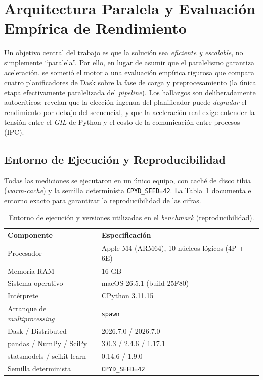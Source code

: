 \documentclass[12pt,letterpaper]{article}
\begin{document}
\section{Arquitectura Paralela y Evaluación Empírica de Rendimiento}
\label{sec:benchmark}
Un objetivo central del trabajo es que la solución sea \textit{eficiente y escalable}, no
simplemente ``paralela''. Por ello, en lugar de asumir que el paralelismo garantiza aceleración,
se sometió el motor a una evaluación empírica rigurosa que compara cuatro planificadores de Dask
sobre la fase de carga y preprocesamiento (la única etapa efectivamente paralelizada del
\textit{pipeline}). Los hallazgos son deliberadamente autocríticos: revelan que la elección ingenua
del planificador puede \textit{degradar} el rendimiento por debajo del secuencial, y que la
aceleración real exige entender la tensión entre el \textit{GIL} de Python y el costo de la
comunicación entre procesos (IPC).

\subsection{Entorno de Ejecución y Reproducibilidad}
Todas las mediciones se ejecutaron en un único equipo, con caché de disco tibia (\textit{warm-cache})
y la semilla determinista \texttt{CPYD\_SEED=42}. La Tabla~\ref{tab:entorno} documenta el entorno
exacto para garantizar la reproducibilidad de las cifras.

\begin{table}[H]
\centering
\small
\begin{tabular}{ll}
\toprule
\textbf{Componente} & \textbf{Especificación} \\
\midrule
Procesador & Apple M4 (ARM64), 10 núcleos lógicos (4P + 6E) \\
Memoria RAM & 16 GB \\
Sistema operativo & macOS 26.5.1 (build 25F80) \\
Intérprete & CPython 3.11.15 \\
Arranque de \textit{multiprocessing} & \texttt{spawn} \\
Dask / Distributed & 2026.7.0 / 2026.7.0 \\
pandas / NumPy / SciPy & 3.0.3 / 2.4.6 / 1.17.1 \\
statsmodels / scikit-learn & 0.14.6 / 1.9.0 \\
Semilla determinista & \texttt{CPYD\_SEED=42} \\
\bottomrule
\end{tabular}
\caption{Entorno de ejecución y versiones utilizadas en el \textit{benchmark} (reproducibilidad).}
\label{tab:entorno}
\end{table}
\end{document}
